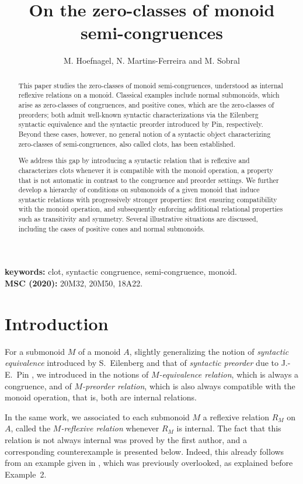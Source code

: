\documentclass[12pt]{article}
\title{On the zero-classes of monoid semi-congruences}
\author{M. Hoefnagel, N. Martins-Ferreira and M. Sobral\\
}
\begin{document}
\maketitle

\begin{abstract}

This paper studies the zero-classes of monoid semi-congruences, understood as internal reflexive relations on a monoid. Classical examples include normal submonoids, which arise as zero-classes of congruences, and positive cones, which are the zero-classes of preorders; both admit well-known syntactic characterizations via the Eilenberg syntactic equivalence and the syntactic preorder introduced by Pin, respectively. Beyond these cases, however, no general notion of a syntactic object characterizing zero-classes of semi-congruences, also called clots, has been established.

We address this gap by introducing a syntactic relation that is reflexive and characterizes clots whenever it is compatible with the monoid operation, a property that is not automatic in contrast to the congruence and preorder settings. We further develop a hierarchy of conditions on submonoids of a given monoid that induce syntactic relations with progressively stronger properties: first ensuring compatibility with the monoid operation, and subsequently enforcing additional relational properties such as transitivity and symmetry. Several illustrative situations are discussed, including the cases of positive cones and normal submonoids.

\end{abstract}
\noindent
\textbf{keywords:} clot, syntactic congruence, semi-congruence, monoid. \\ 
\noindent\textbf{MSC (2020):} 20M32, 20M50, 18A22.


\section{Introduction}

For a submonoid $M$ of a monoid $A$, slightly generalizing the notion of {\em syntactic equivalence} introduced by S.~Eilenberg \cite{E} and that of {\em syntactic preorder} due to J.-E.~Pin \cite{P,HP}, we introduced in \cite{MFS3} the notions of {\em $M$-equivalence relation}, which is always a congruence, and of {\em $M$-preorder relation}, which is also always compatible with the monoid operation, that is, both are internal relations.

In the same work, we associated to each submonoid $M$ a reflexive relation $R_M$ on $A$, called the {\em $M$-reflexive relation} whenever $R_M$ is internal. The fact that this relation is not always internal was proved by the first author, and a corresponding counterexample is presented below. Indeed, this already follows from an example given in \cite{MFS3}, which was previously overlooked, as explained before Example~2.
\end{document}
